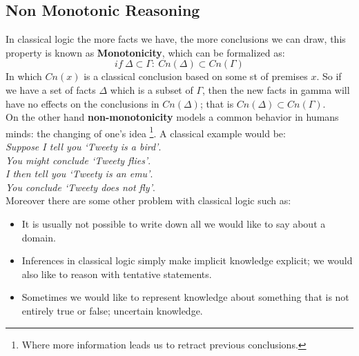 \documentclass[10pt,a4paper]{article}
\begin{document}
\begin{itemize}
\newpage

\section{Non Monotonic Reasoning}

In classical logic the more facts we have, the more conclusions we can draw, this property is known as \textbf{Monotonicity}, which can be formalized as:
\[if\ \Delta \subset \Gamma:\ Cn(\Delta)\subset Cn(\Gamma)\]
In which $Cn(x)$ is a classical conclusion based on some st of premises $x$. So if we have a set of facts $\Delta$ which is a subset of $\Gamma$, then the new facts in gamma will have no effects on the conclusions in $Cn(\Delta)$; that is $  Cn(\Delta)\subset Cn(\Gamma)$.\\
On the other hand \textbf{non-monotonicity} models a common behavior in humans minds: the changing of one's idea \footnote{Where more information leads us to retract previous conclusions.}. A classical example would be:\\ 
\textit{Suppose I tell you ‘Tweety is a bird’}.\\
\textit{You might conclude ‘Tweety flies’}.\\
\textit{I then tell you ‘Tweety is an emu’}.\\
\textit{You conclude ‘Tweety does not fly’}.\\

Moreover there are some other problem with classical logic such as:
\begin{itemize}
\item It is usually not possible to write down all we would like to say about a domain.
\item  Inferences in classical logic simply make implicit knowledge explicit; we would also like to reason with tentative statements.
\item Sometimes we would like to represent knowledge about something that is not entirely true or false; uncertain knowledge.
\end{itemize}


\end{itemize}
\end{document}
